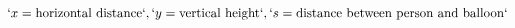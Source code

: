 \documentclass[preview]{standalone}
\begin{document}
\begin{align*}
`x = \text{horizontal distance}`, `y = \text{vertical height}`, `s = \text{distance between person and balloon}`
\end{align*}
\end{document}
